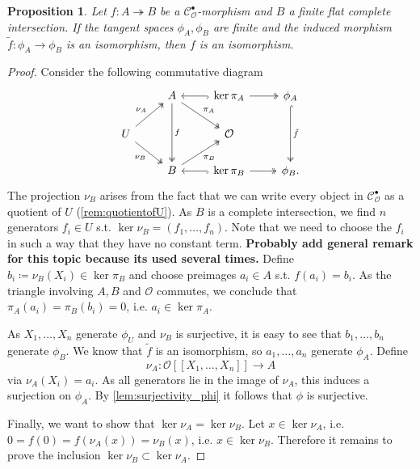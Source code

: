 \documentclass{article}
\theoremstyle{plain}%
\newtheorem{proposition}{Proposition}[section]
\theoremstyle{definition}
\theoremstyle{remark}
\newcommand{\cob}{\mathcal{C}_\mathcal{O}^\bullet}
\begin{document}
\begin{proposition}\cite[theorem 5.21]{darmon1995fermat}\label{prop:phi_iso}
    Let \(f\colon A \twoheadrightarrow B\) be a \(\cob\)-morphism and \(B\) a finite flat complete intersection.
    If the tangent spaces \(\phi_A, \phi_B\) are finite and 
    the induced morphism \(\tilde f\colon \phi_A \to \phi_B\) is an isomorphism,
    then \(f\) is an isomorphism.
\end{proposition}
\begin{proof}
    Consider the following commutative diagram
    \[
        \begin{tikzcd}
             & A \arrow[dd, "f", two heads] \arrow[rd, "\pi_A", two heads] 
             & \arrow[l, hook]\ker \pi_A \arrow[r, two heads]
             & \phi_A \arrow[dd, hook, two heads, "\tilde f"]\\
            U \arrow[ru, "\nu_A", two heads]\arrow[rd, "\nu_B"', two heads] & & \mathcal{O}&\\
             & B \arrow[ru, "\pi_B"', two heads] & \arrow[l, hook]\ker \pi_B \arrow[r, two heads] & \phi_B.
        \end{tikzcd}
    \]
    The projection \(\nu_B\) arises from the fact that we can write every object in \(\cob\)
    as a quotient of \(U\) (\cref{rem:quotientofU}).
    As \(B\) is a complete intersection, we find \(n\) generators \(f_i \in U\) s.t. \(\ker \nu_B = (f_1, \dots, f_n)\).
    Note that we need to choose the \(f_i\) in such a way that they have no constant term. 
    \textbf{Probably add general remark for this topic because its used several times.}
    Define \(b_i \coloneqq \nu_B(X_i) \in \ker \pi_B\) and choose preimages \(a_i \in A\) s.t. \(f(a_i) = b_i\).
    As the triangle involving \(A, B\) and \(\mathcal{O}\) commutes, we conclude that \(\pi_A(a_i) = \pi_B(b_i) = 0\),
    i.e. \(a_i \in \ker \pi_A\).
    
    As \(X_1, \dots, X_n\) generate \(\phi_U\) and \(\nu_B\) is surjective, it is easy to see that 
    \(b_1, \dots, b_n\) generate \(\phi_B\).
    We know that \(\tilde f\) is an isomorphism, so \(a_1, \dots, a_n\) generate \(\phi_A\).
    Define
    \[
        \nu_A \colon \mathcal{O}[[X_1, \dots, X_n]] \to A
    \] via \(\nu_A(X_i) = a_i\).
    As all generators lie in the image of \(\nu_A\), this induces a surjection on \(\phi_A\).
    By \cref{lem:surjectivity_phi} it follows that \(\phi\) is surjective.
    
    Finally, we want to show that \(\ker \nu_A = \ker \nu_B\).
    Let \(x \in \ker \nu_A\), i.e. \(0 = f(0) = f(\nu_A(x)) = \nu_B(x)\), i.e. \(x \in \ker \nu_B\).
    Therefore it remains to prove the inclusion \(\ker \nu_B \subset \ker \nu_A\).
    

\end{proof}
\end{document}
